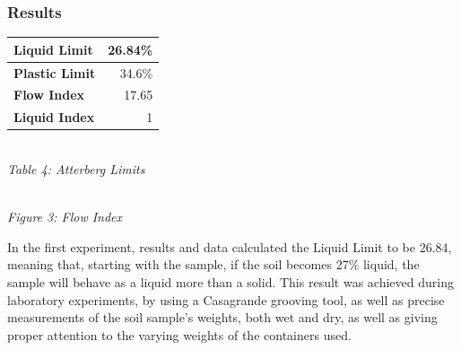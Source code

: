 \documentclass{article}
\begin{document}
\subsubsection{Results}
\begin{center}
    \begin{tabular}{|l|r|}
        \hline 
        \textbf{Liquid Limit} & 26.84\%\\\hline
        \textbf{Plastic Limit} & 34.6\%\\\hline
        \textbf{Flow Index} & 17.65\\\hline
        \textbf{Liquid Index} & 1\\\hline
    \end{tabular}
    \vspace{3mm}
    \emph{\\Table 4: Atterberg Limits}
\end{center}
\begin{center}  
    \pgfplotsset{width=10cm}
    \vspace{3mm}
    \emph{\\Figure 3: Flow Index}
\end{center}
\par In the first experiment, results and data calculated the Liquid Limit to be 26.84, meaning that, starting with the sample, if the soil becomes 27\% liquid, the sample will behave as a liquid more than a solid. This result was achieved during laboratory experiments, by using a Casagrande grooving tool, as well as precise measurements of the soil sample's weights, both wet and dry, as well as giving proper attention to the varying weights of the containers used.  
\end{document}

